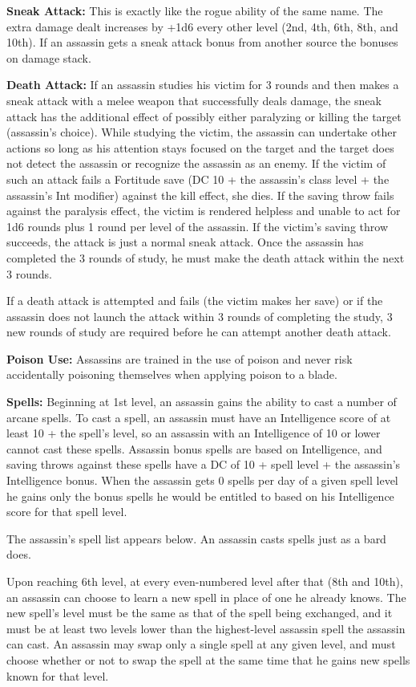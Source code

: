 \documentclass{article}
\begin{document}
\textbf{Sneak Attack:} This is exactly like the rogue ability of the same name. 
The extra damage dealt increases by +1d6 every other level (2nd, 4th, 6th, 8th, 
and 10th). If an assassin gets a sneak attack bonus from another source the bonuses 
on damage stack.

\textbf{Death Attack:} If an assassin studies his victim for 3 rounds and then 
makes a sneak attack with a melee weapon that successfully deals damage, the sneak 
attack has the additional effect of possibly either paralyzing or killing the target 
(assassin's choice). While studying the victim, the assassin can undertake other 
actions so long as his attention stays focused on the target and the target does 
not detect the assassin or recognize the assassin as an enemy. If the victim of 
such an attack fails a Fortitude save (DC 10 + the assassin's class level + the 
assassin's Int modifier) against the kill effect, she dies. If the saving throw 
fails against the paralysis effect, the victim is rendered helpless and unable 
to act for 1d6 rounds plus 1 round per level of the assassin. If the victim's saving 
throw succeeds, the attack is just a normal sneak attack. Once the assassin has 
completed the 3 rounds of study, he must make the death attack within the next 
3 rounds.

If a death attack is attempted and fails (the victim makes her save) or if the 
assassin does not launch the attack within 3 rounds of completing the study, 3 
new rounds of study are required before he can attempt another death attack.

\textbf{Poison Use:} Assassins are trained in the use of poison and never risk 
accidentally poisoning themselves when applying poison to a blade.

\textbf{Spells:} Beginning at 1st level, an assassin gains the ability to cast 
a number of arcane spells. To cast a spell, an assassin must have an Intelligence 
score of at least 10 + the spell's level, so an assassin with an Intelligence of 
10 or lower cannot cast these spells. Assassin bonus spells are based on Intelligence, 
and saving throws against these spells have a DC of 10 + spell level + the assassin's 
Intelligence bonus. When the assassin gets 0 spells per day of a given spell level 
he gains only the bonus spells he would be entitled to based on his Intelligence 
score for that spell level.

The assassin's spell list appears below. An assassin casts spells just as a bard 
does.

Upon reaching 6th level, at every even-numbered level after that (8th and 10th), 
an assassin can choose to learn a new spell in place of one he already knows. The 
new spell's level must be the same as that of the spell being exchanged, and it 
must be at least two levels lower than the highest-level assassin spell the assassin 
can cast. An assassin may swap only a single spell at any given level, and must 
choose whether or not to swap the spell at the same time that he gains new spells 
known for that level.
\end{document}
